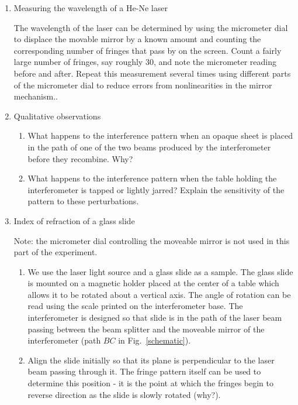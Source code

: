 \begin{enumerate}
\item \label{proc:lambda} Measuring the wavelength of a He-Ne laser

The wavelength of the laser can be determined by using the micrometer
dial to displace the movable mirror by a known amount and counting
the corresponding number of fringes that pass by on the screen.
Count a fairly large number of fringes, say roughly 30, and note the
micrometer reading before and after.  Repeat this measurement several
times using different parts of the micrometer dial to reduce errors from
nonlinearities in the mirror mechanism..

\item Qualitative observations

\begin{enumerate}
\item What happens to the interference pattern when an opaque sheet 
is placed in the path of one of the two beams produced by the 
interferometer before they recombine. Why?

\item What happens to the interference pattern when the table holding 
the interferometer is tapped or lightly jarred? Explain the sensitivity 
of the pattern to these perturbations.
\end{enumerate}

 \item Index of refraction of a glass slide

Note: the micrometer dial controlling the moveable mirror is 
not used in this part of the experiment. 

\begin{enumerate}
\item We use the laser light source and a glass slide as a sample.
The glass slide is mounted on a magnetic holder placed at the center of a
table which allows it to be rotated about a vertical axis.  The angle of
rotation can be read using the scale printed on the interferometer base.
The interferometer is designed so that slide is in the path of the laser
beam passing between the beam splitter and the moveable mirror of the
interferometer (path $BC$ in Fig.~\ref{schematic}).

\item Align the slide initially so that its plane is perpendicular 
to the laser beam passing through it. The fringe pattern itself 
can be used to determine this position - it is the point at which 
the fringes begin to reverse direction as the slide is slowly 
rotated (why?). 


\end{enumerate}
\end{enumerate}
